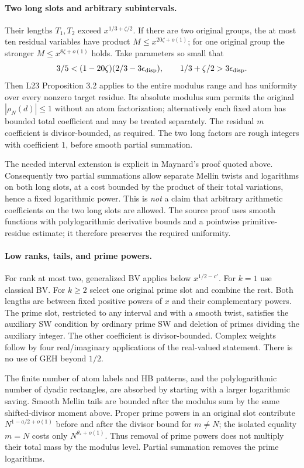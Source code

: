 \paragraph{Two long slots and arbitrary subintervals.}
Their lengths $T_1,T_2$ exceed $x^{1/3+\zeta/2}$. If there are two
original groups, the at most ten residual variables have product
$M\le x^{20\zeta+o(1)}$; for one original group the stronger
$M\le x^{8\zeta+o(1)}$ holds. Take parameters so small that
\[
 3/5<(1-20\zeta)(2/3-3\epsilon_{\rm disp}),
 \qquad 1/3+\zeta/2>3\epsilon_{\rm disp}.
\]
Then L23 Proposition 3.2 applies to the entire modulus range and has
uniformity over every nonzero target residue. Its absolute modulus
sum permits the original $|\rho_N(d)|\le1$ without an atom
factorization; alternatively each fixed atom has bounded total
coefficient and may be treated separately. The residual $m$ coefficient
is divisor-bounded, as required. The two long factors are rough
integers with coefficient $1$, before smooth partial summation.

The needed interval extension is explicit in Maynard's proof quoted
above. Consequently two partial summations allow separate Mellin
twists and logarithms on both long slots, at a cost bounded by the
product of their total variations, hence a fixed logarithmic power.
This is \emph{not} a claim that arbitrary arithmetic coefficients on
the two long slots are allowed. The source proof uses smooth functions
with polylogarithmic derivative bounds and a pointwise primitive-
residue estimate; it therefore preserves the required uniformity.

\paragraph{Low ranks, tails, and prime powers.}
For rank at most two, generalized BV applies below $x^{1/2-c'}$.
For $k=1$ use classical BV. For $k\ge2$ select one original prime
slot and combine the rest. Both lengths are between fixed positive
powers of $x$ and their complementary powers. The prime slot,
restricted to any interval and with a smooth twist, satisfies the
auxiliary SW condition by ordinary prime SW and deletion of primes
dividing the auxiliary integer. The other coefficient is
divisor-bounded. Complex weights follow by four real/imaginary
applications of the real-valued statement. There is no use of GEH
beyond $1/2$.

The finite number of atom labels and HB patterns, and the
polylogarithmic number of dyadic rectangles, are absorbed by starting
with a larger logarithmic saving. Smooth Mellin tails are bounded
after the modulus sum by the same shifted-divisor moment above.
Proper prime powers in an original slot contribute
$N^{1-a/2+o(1)}$ before and after the divisor bound for $m\ne N$;
the isolated equality $m=N$ costs only $N^{\theta_*+o(1)}$.
Thus removal of prime powers does not multiply their total mass by
the modulus level. Partial summation removes the prime logarithms.


